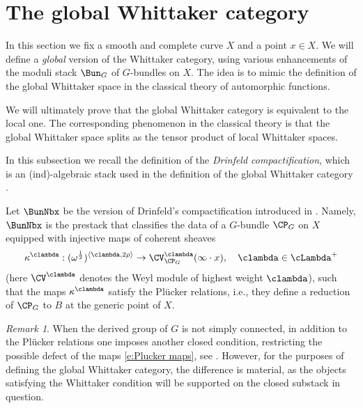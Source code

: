 \documentclass[9pt]{amsart}
\theoremstyle{definition}
\theoremstyle{remark}
\newtheorem{rem}[subsubsection]{Remark}
\numberwithin{equation}{section}
\begin{document}
\section{The global Whittaker category}   \label{s:global}

In this section we fix a smooth and complete curve $X$ and a point $x\in X$. We will define a \emph{global} version of the Whittaker
category, using various enhancements of the moduli stack $\Bun_G$ of $G$-bundles on $X$. 
The idea is to mimic the definition of the global Whittaker space in the classical theory of automorphic functions. 

\medskip

We will ultimately prove that the global Whittaker category is equivalent to the local one. The corresponding phenomenon
in the classical theory is that the global Whittaker space splits as the tensor product of local Whittaker spaces. 

  \label{ss:Drinf comp}

In this subsection we recall the definition of the \emph{Drinfeld compactification}, which is an (ind)-algebraic stack
used in the definition of the global Whittaker category .  

\sssec{}

Let $\BunNbx$ be the version of Drinfeld's compactification
introduced in \cite{Ga3}. Namely, $\BunNbx$ is the prestack that classifies the data of a $G$-bundle $\CP_G$ on $X$ 
equipped with injective maps of coherent sheaves
\begin{equation}  \label{e:Plucker maps}
\kappa^{\clambda}:(\omega^{\frac{1}{2}})^{\langle \clambda,2\rho\rangle}\to \CV^{\clambda}_{\CP_G}(\infty \cdot x), \quad \clambda\in \cLambda^+
\end{equation}
(here $\CV^{\clambda}$ denotes the Weyl module of highest weight $\clambda$), such that the maps $\kappa^{\clambda}$ satisfy
the Pl\"ucker relations, i.e., they define a reduction of $\CP_G$ to $B$ at the generic point of $X$. 

\begin{rem}
When the derived group of $G$ is not simply connected, in addition to the Pl\"ucker relations one imposes another closed condition,
restricting the possible defect of the maps \eqref{e:Plucker maps}, see \cite[Sect. 7]{Sch}. However, for the purposes of defining the global Whittaker
category, the difference is material, as the objects satisfying the Whittaker condition will be supported on the closed substack in question.
\end{rem} 
\end{document}
